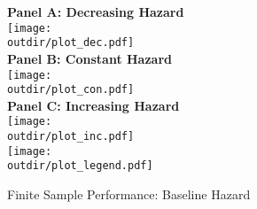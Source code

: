 \documentclass[letter]{article}
\newcommand{\outdir}{./../output}
\begin{document}
\begin{figure}[p]\caption{Finite Sample Performance: Baseline Hazard}\label{fig:sims_haz}
\footnotesize \centering
\vspace{1em}
\textbf{Panel A: Decreasing Hazard} \\ \vspace{1em}
\texttt{[image: \\outdir/plot\_dec.pdf]} \\ \vspace{1em}
\textbf{Panel B: Constant Hazard} \\ \vspace{1em}
\texttt{[image: \\outdir/plot\_con.pdf]} \\ \vspace{1em}
\textbf{Panel C: Increasing Hazard} \\ \vspace{1em}
\texttt{[image: \\outdir/plot\_inc.pdf]} \\ 
\texttt{[image: \\outdir/plot\_legend.pdf]}
\end{figure}

\end{document}
